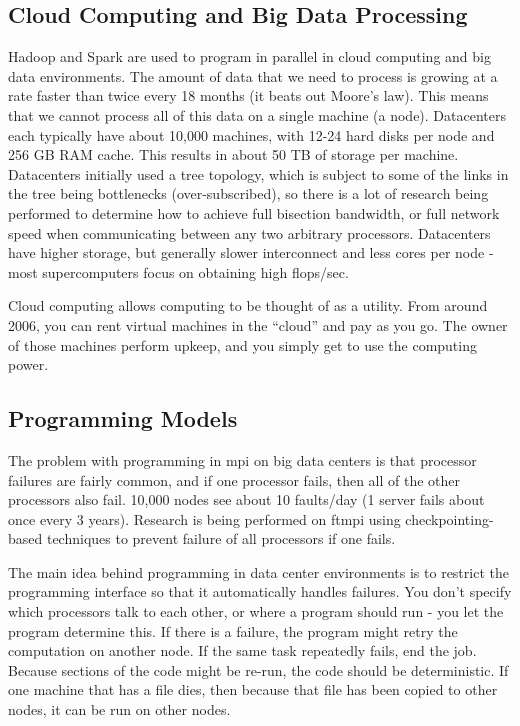 \documentclass[10pt]{article}
\begin{document}
\begin{flushleft}
\section{Cloud Computing and Big Data Processing}

Hadoop and Spark are used to program in parallel in cloud computing and big data environments. The amount of data that we need to process is growing at a rate faster than twice every 18 months (it beats out Moore's law). This means that we cannot process all of this data on a single machine (a node). Datacenters each typically have about 10,000 machines, with 12-24 hard disks per node and 256 GB RAM cache. This results in about 50 TB of storage per machine. Datacenters initially used a tree topology, which is subject to some of the links in the tree being bottlenecks (over-subscribed), so there is a lot of research being performed to determine how to achieve full bisection bandwidth, or full network speed when communicating between any two arbitrary processors. Datacenters have higher storage, but generally slower interconnect and less cores per node - most supercomputers focus on obtaining high flops/sec.

Cloud computing allows computing to be thought of as a utility. From around 2006, you can rent virtual machines in the ``cloud'' and pay as you go. The owner of those machines perform upkeep, and you simply get to use the computing power. 

\subsection{Programming Models}

The problem with programming in \gls{mpi} on big data centers is that processor failures are fairly common, and if one processor fails, then all of the other processors also fail. 10,000 nodes see about 10 faults/day (1 server fails about once every 3 years). Research is being performed on \gls{ftmpi} using checkpointing-based techniques to prevent failure of all processors if one fails.

The main idea behind programming in data center environments is to restrict the programming interface so that it automatically handles failures. You don't specify which processors talk to each other, or where a program should run - you let the program determine this. If there is a failure, the program might retry the computation on another node. If the same task repeatedly fails, end the job. Because sections of the code might be re-run, the code should be deterministic. If one machine that has a file dies, then because that file has been copied to other nodes, it can be run on other nodes. 


\end{flushleft}
\end{document}
